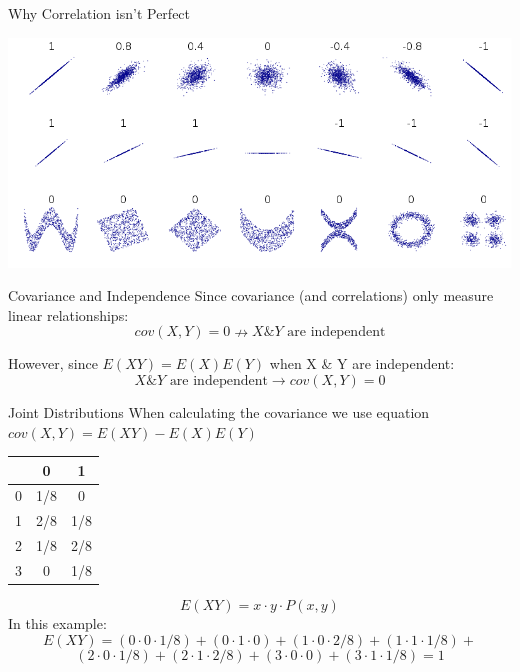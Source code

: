 \documentclass{beamer}
\begin{document}
\begin{frame}{Why Correlation isn't Perfect}
	\begin{center}
		\includegraphics[width=\textwidth]{corr}
	\end{center}
\end{frame}

\begin{frame}{Covariance and Independence}
	Since covariance (and correlations) only measure linear relationships:
	$$cov(X,Y) = 0 \nrightarrow X \& Y \text{ are independent}$$
	
	However, since $E(XY)=E(X)E(Y)$ when X \& Y are independent:
	$$X \& Y \text{ are independent} \rightarrow cov(X,Y)=0$$
\end{frame}


\begin{frame}{Joint Distributions}
	When calculating the covariance we use equation $cov(X,Y) = E(XY)-E(X)E(Y)$
	\begin{center}
		\small{\begin{tabular}{|c|c|c|}
			\hline
			\diagbox{$X$}{$Y$} & 0 & 1 \\
			\hline
			0 & 1/8 & 0 \\
			\hline
			1 & 2/8 & 1/8 \\
			\hline
			2 & 1/8 & 2/8 \\
			\hline
			3 & 0 & 1/8 \\
			\hline
			\end{tabular}}
	\end{center}
	$$E(XY)=x\cdot y \cdot P(x,y)$$
	In this example:
	$$E(XY)=(0\cdot 0 \cdot 1/8) + (0\cdot  1\cdot 0) + (1\cdot 0 \cdot 2/8) + (1\cdot 1 \cdot 1/8)+$$
	$$(2\cdot 0 \cdot 1/8) + (2\cdot 1 \cdot 2/8) + (3\cdot 0 \cdot 0) + (3\cdot 1 \cdot 1/8)=1$$
\end{frame}
\end{document}
